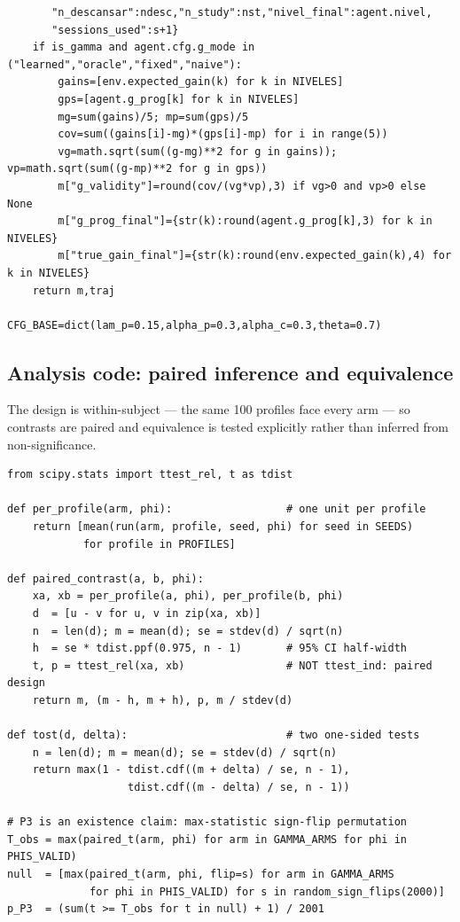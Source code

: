 \documentclass{article}
\begin{document}
\begin{verbatim}
       "n_descansar":ndesc,"n_study":nst,"nivel_final":agent.nivel,
       "sessions_used":s+1}
    if is_gamma and agent.cfg.g_mode in ("learned","oracle","fixed","naive"):
        gains=[env.expected_gain(k) for k in NIVELES]
        gps=[agent.g_prog[k] for k in NIVELES]
        mg=sum(gains)/5; mp=sum(gps)/5
        cov=sum((gains[i]-mg)*(gps[i]-mp) for i in range(5))
        vg=math.sqrt(sum((g-mg)**2 for g in gains)); vp=math.sqrt(sum((g-mp)**2 for g in gps))
        m["g_validity"]=round(cov/(vg*vp),3) if vg>0 and vp>0 else None
        m["g_prog_final"]={str(k):round(agent.g_prog[k],3) for k in NIVELES}
        m["true_gain_final"]={str(k):round(env.expected_gain(k),4) for k in NIVELES}
    return m,traj

CFG_BASE=dict(lam_p=0.15,alpha_p=0.3,alpha_c=0.3,theta=0.7)
\end{verbatim}
\normalsize

\subsection{Analysis code: paired inference and equivalence}
\label{app:paired}
The design is within-subject --- the same 100 profiles face every arm --- so contrasts are paired and equivalence is tested explicitly rather than inferred from non-significance.
\begin{verbatim}
from scipy.stats import ttest_rel, t as tdist

def per_profile(arm, phi):                  # one unit per profile
    return [mean(run(arm, profile, seed, phi) for seed in SEEDS)
            for profile in PROFILES]

def paired_contrast(a, b, phi):
    xa, xb = per_profile(a, phi), per_profile(b, phi)
    d  = [u - v for u, v in zip(xa, xb)]
    n  = len(d); m = mean(d); se = stdev(d) / sqrt(n)
    h  = se * tdist.ppf(0.975, n - 1)       # 95% CI half-width
    t, p = ttest_rel(xa, xb)                # NOT ttest_ind: paired design
    return m, (m - h, m + h), p, m / stdev(d)

def tost(d, delta):                         # two one-sided tests
    n = len(d); m = mean(d); se = stdev(d) / sqrt(n)
    return max(1 - tdist.cdf((m + delta) / se, n - 1),
                   tdist.cdf((m - delta) / se, n - 1))

# P3 is an existence claim: max-statistic sign-flip permutation
T_obs = max(paired_t(arm, phi) for arm in GAMMA_ARMS for phi in PHIS_VALID)
null  = [max(paired_t(arm, phi, flip=s) for arm in GAMMA_ARMS
             for phi in PHIS_VALID) for s in random_sign_flips(2000)]
p_P3  = (sum(t >= T_obs for t in null) + 1) / 2001
\end{verbatim}

\newpage

\end{document}
